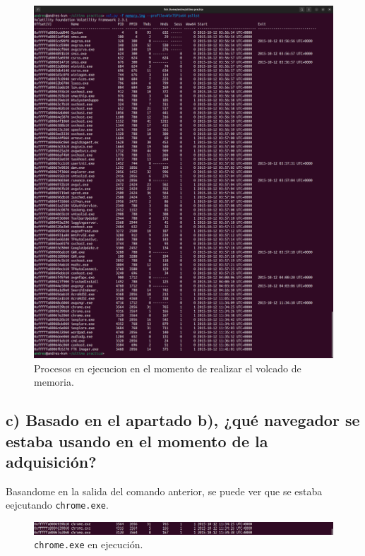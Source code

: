\documentclass{article}
\begin{document}
\begin{figure}[H]
    \centering
    \includegraphics[width=\textwidth]{imagenes/pslist.png}
    \caption{Procesos en ejecucion en el momento de realizar el volcado de memoria.}
\end{figure}

\newpage
\subsection{c) Basado en el apartado b), ¿qué navegador se estaba usando en el momento de la adquisición?}

Basandome en la salida del comando anterior, se puede ver que se estaba eejcutando \verb|chrome.exe|.

\begin{figure}[H]
    \centering
    \includegraphics[width=\textwidth]{imagenes/pslist-1.png}
    \caption{\texttt{chrome.exe} en ejecución.}
\end{figure}
\end{document}
